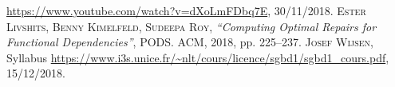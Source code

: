 \documentclass[12pt, a4paper, oneside, titlepage]{book}%
\begin{document}
\clearpage
\appendix

\begin{thebibliography}{9}
 \url{https://www.youtube.com/watch?v=dXoLmFDbq7E}, 30/11/2018.
 \textsc{Ester Livshits, Benny Kimelfeld, Sudeepa Roy}, \textit{ “Computing Optimal Repairs for Functional Dependencies”}, PODS. ACM, 2018, pp. 225–237.
 \textsc{Josef Wijsen}, {Syllabus}
 \url{https://www.i3s.unice.fr/~nlt/cours/licence/sgbd1/sgbd1_cours.pdf}, 15/12/2018.
\end{thebibliography}

\end{document}
